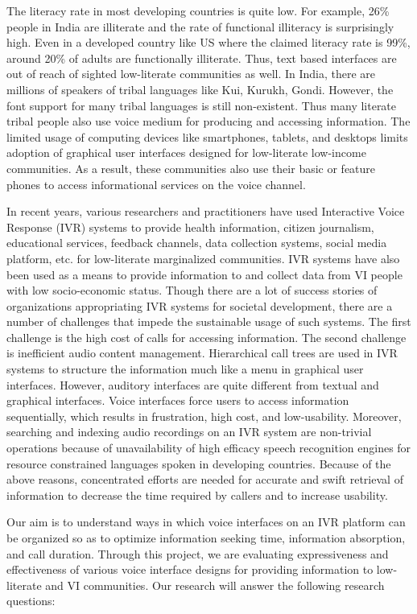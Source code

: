 \documentclass{sigchi}
\begin{document}
The literacy rate in most developing countries is quite low. For example, 26\% people in India are illiterate and the rate of functional illiteracy is surprisingly high. Even in a developed country like US where the claimed literacy rate is 99\%, around 20\% of adults are functionally illiterate. Thus, text based interfaces are out of reach of sighted low-literate communities as well. In India, there are millions of speakers of tribal languages like Kui, Kurukh, Gondi. However, the font support for many tribal languages is still non-existent. Thus many literate tribal people also use voice medium for producing and accessing information. The limited usage of computing devices like smartphones, tablets, and desktops limits adoption of graphical user interfaces designed for low-literate low-income communities. As a result, these communities also use their basic or feature phones to access informational services on the voice channel.

In recent years, various researchers and practitioners have used Interactive Voice Response (IVR) systems to provide health information, citizen journalism, educational services, feedback channels, data collection systems, social media platform, etc. for low-literate marginalized communities. IVR systems have also been used as a means to provide information to and collect data from VI people with low socio-economic status. Though there are a lot of success stories of organizations appropriating IVR systems for societal development, there are a number of challenges that impede the sustainable usage of such systems. The first challenge is the high cost of calls for accessing information. The second challenge is inefficient audio content management. Hierarchical call trees are used in IVR systems to structure the information much like a menu in graphical user interfaces. However, auditory interfaces are quite different from textual and graphical interfaces. Voice interfaces force users to access information sequentially, which results in frustration, high cost, and low-usability. Moreover, searching and indexing audio recordings on an IVR system are non-trivial operations because of unavailability of high efficacy speech recognition engines for resource constrained languages spoken in developing countries. Because of the above reasons, concentrated efforts are needed for accurate and swift retrieval of information to decrease the time required by callers and to increase usability. 

Our aim is to understand ways in which voice interfaces on an IVR platform can be organized so as to optimize information seeking time, information absorption, and call duration. Through this project, we are evaluating expressiveness and effectiveness of various voice interface designs for providing information to low-literate and VI communities. Our research will answer the following research questions:
\end{document}
